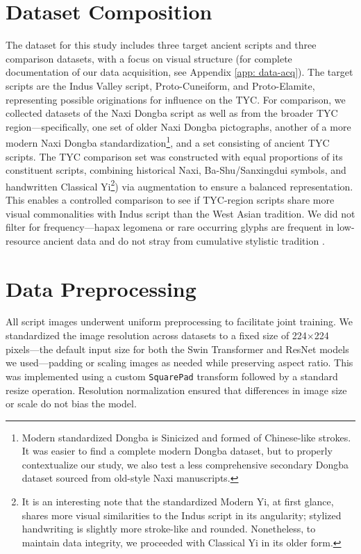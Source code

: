 \documentclass[11pt,a4paper,oneside]{report}
\begin{document}
\section{Dataset Composition}
\noindent\hspace{1cm}
The dataset for this study includes three target ancient scripts and three comparison datasets, with a focus on visual structure (for complete documentation of our data acquisition, see Appendix \ref{app: data-acq}). The target scripts are the Indus Valley script, Proto-Cuneiform, and Proto-Elamite, representing possible originations for influence on the TYC. For comparison, we collected datasets of the Naxi Dongba script as well as from the broader TYC region—specifically, one set of older Naxi Dongba pictographs, another of a more modern Naxi Dongba standardization\footnote{Modern standardized Dongba is Sinicized and formed of Chinese-like strokes. It was easier to find a complete modern Dongba dataset, but to properly contextualize our study, we also test a less comprehensive secondary Dongba dataset sourced from old-style Naxi manuscripts.}, and a set consisting of ancient TYC scripts. The TYC comparison set was constructed with equal proportions of its constituent scripts, combining historical Naxi, Ba-Shu/Sanxingdui symbols, and handwritten Classical Yi\footnote{It is an interesting note that the standardized Modern Yi, at first glance, shares more visual similarities to the Indus script in its angularity; stylized handwriting is slightly more stroke-like and rounded. Nonetheless, to maintain data integrity, we proceeded with Classical Yi in its older form.}) via augmentation to ensure a balanced representation. This enables a controlled comparison to see if TYC-region scripts share more visual commonalities with Indus script than the West Asian tradition. We did not filter for frequency—hapax legomena or rare occurring glyphs are frequent in low-resource ancient data and do not stray from cumulative stylistic tradition \cite{parpola_deciphering_1994, fuls_ancient_2020}.

\section{Data Preprocessing}
\noindent\hspace{1cm}
All script images underwent uniform preprocessing to facilitate joint training. We standardized the image resolution across datasets to a fixed size of 224$\times$224 pixels—the default input size for both the Swin Transformer and ResNet models we used—padding or scaling images as needed while preserving aspect ratio. This was implemented using a custom \texttt{SquarePad} transform followed by a standard resize operation. Resolution normalization ensured that differences in image size or scale do not bias the model. 
\end{document}
